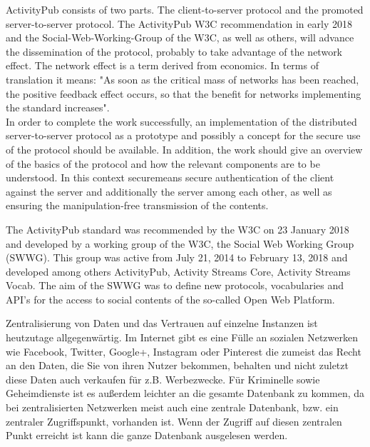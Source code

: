 {	ActivityPub consists of two parts. The client-to-server protocol and the promoted server-to-server protocol. The ActivityPub W3C recommendation in early 2018 and the Social-Web-Working-Group of the W3C, as well as others, will advance the dissemination of the protocol, probably to take advantage of the network effect. The network effect is a term derived from economics. In terms of translation it means: "As soon as the critical mass of networks has been reached, the positive feedback effect occurs, so that the benefit for networks implementing the standard increases".\\
	
	In order to complete the work successfully, an implementation of the distributed server-to-server protocol as a prototype and possibly a concept for the secure use of the protocol should be available. In addition, the work should give an overview of the basics of the protocol and how the relevant components are to be understood. In this context \glqq secure\grqq means secure authentication of the client against the server and additionally the server among each other, as well as ensuring the manipulation-free transmission of the contents.\\
	
	
	The ActivityPub\cite{activityPub} standard was recommended by the W3C on 23 January 2018 and developed by a working group of the W3C, the Social Web Working Group (SWWG)\cite{socialWg,pushSocialWeb}. This group was active from July 21, 2014 to February 13, 2018\cite{socialWg} and developed among others ActivityPub, Activity Streams Core\cite{activityStreamsCore}, Activity Streams Vocab\cite{activityStreamsVocabulary}. The aim of the SWWG was to define new protocols, vocabularies and API's for the access to social contents of the so-called Open Web Platform\cite{social-wg-charter}.

}{
	Zentralisierung von Daten und das Vertrauen auf einzelne Instanzen ist heutzutage allgegenwärtig. Im Internet gibt es eine Fülle an sozialen Netzwerken wie Facebook, Twitter, Google+, Instagram oder Pinterest die zumeist das Recht an den Daten, die Sie von ihren Nutzer bekommen, behalten und nicht zuletzt diese Daten auch verkaufen für z.B. Werbezwecke. Für Kriminelle sowie Geheimdienste ist es außerdem leichter an die gesamte Datenbank zu kommen, da bei zentralisierten Netzwerken meist auch eine zentrale Datenbank, bzw. ein zentraler Zugriffspunkt, vorhanden ist. Wenn der Zugriff auf diesen zentralen Punkt erreicht ist kann die ganze Datenbank ausgelesen werden.\\
	
}
